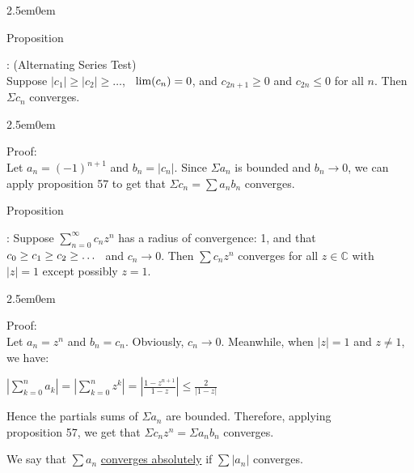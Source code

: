 \documentclass{book}
\newcommand{\hTwo}{%
   \color{MidnightBlue}%
   \fontsize{13}{15}\selectfont%
}
\newcommand{\hThree}{%
   \color{PineGreen}
   \fontsize{13}{15}\selectfont%
}
\newenvironment{myIndent}{%
   \begin{adjustwidth}{2.5em}{0em}%
}{%
   \end{adjustwidth}%
}
\newcommand{\udefine}[1]{%
   \setulcolor{Red}%
   \setul{0.14em}{0.07em}%
   \ul{#1}%
}
\newcommand{\retTwo}{\hfill\bigbreak}
\newcommand{\myHS}{ \hspace{0.5em}}
\newcounter{PropNumber}
\newcommand{\propCount}[1][1]{%
   \addtocounter{PropNumber}{#1}%
   \thePropNumber%
}
\begin{document}
   {\begin{myIndent} \hTwo
      Proposition \propCount: (Alternating Series Test)\\ Suppose $|c_1| \geq |c_2| \geq \ldots$, $\myHS \lim(c_n) = 0$, and $c_{2n+1}\geq0$ and $c_{2n} \leq 0$ for all $n$. Then $\Sigma c_n$ converges.
      
      {\begin{myIndent} \hThree
         Proof:\\
         Let $a_n = (-1)^{n+1}$ and $b_n = |c_n|$. Since $\Sigma a_n$ is bounded and $b_n \rightarrow 0$, we can apply proposition 57 to get that $\Sigma c_n = \sum a_n b_n$ converges.
      \end{myIndent}}

      \newpage

      Proposition \propCount: Suppose $\sum\limits_{n=0}^\infty{c_nz^n}$ has a radius of convergence: 1, and that\\ $c_0 \geq c_1 \geq c_2 \geq \ldots \myHS$ and $c_n \rightarrow 0$. Then $\sum c_nz^n$ converges for all $z \in \mathbb{C}$ with\\ [6pt] $|z| = 1$ except possibly $z = 1$.

      {\begin{myIndent} \hThree
         Proof:\\
         Let $a_n = z^n$ and $b_n = c_n$. Obviously, $c_n \rightarrow 0$. Meanwhile, when $|z| = 1$ and $z \neq 1$, we have:

         {\center $ \left| \sum\limits_{k=0}^n{a_k} \right| = \left| \sum\limits_{k=0}^n{z^k} \right| = \left| \frac{1 - z^{n+1}}{1 - z} \right| \leq \frac{2}{|1 - z|}$ \retTwo\par}

         Hence the partials sums of $\Sigma a_n$ are bounded. Therefore, applying\\ proposition 57, we get that $\Sigma c_nz^n = \Sigma a_nb_n$ converges. \retTwo
      \end{myIndent}}
   \end{myIndent}}

   We say that $\sum a_n$ \udefine{converges absolutely} if $\sum |a_n|$ converges. \retTwo
\end{document}
